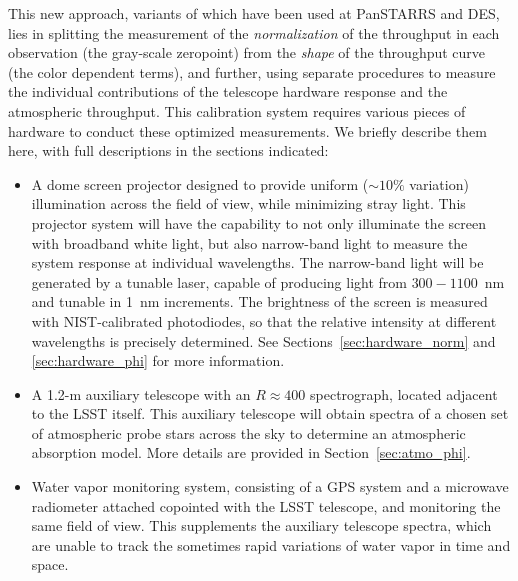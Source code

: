 \documentclass[12pt,preprint]{aastex}
\begin{document}
This new approach, variants of which have been used at PanSTARRS and DES, lies in splitting the measurement of the {\it
normalization} of the throughput in each observation (the gray-scale
zeropoint) from the {\it shape} of the throughput curve (the color
dependent terms), and further, using separate procedures to measure
the individual contributions of the telescope hardware response and
the atmospheric throughput. This calibration system requires various
pieces of hardware to conduct these optimized measurements. We briefly
describe them here, with full descriptions in the sections indicated:
\begin{itemize}
\item{A dome screen projector designed to provide uniform
    ($\sim10\%$ variation) illumination across the field of view, while
    minimizing stray light. This projector system will have the
    capability to not only illuminate the screen with broadband white
    light, but also narrow-band light to measure the system response
    at individual wavelengths. The narrow-band light will be generated
    by a tunable laser, capable of producing light from $300-1100$~nm
    and tunable in 1~nm increments. The brightness of the screen is measured 
    with NIST-calibrated photodiodes, so that the relative intensity at different 
    wavelengths is precisely determined.  See
    Sections~\ref{sec:hardware_norm} and \ref{sec:hardware_phi} for
    more information.}
\item{A 1.2-m auxiliary telescope with an $R \approx 400$ spectrograph,
    located adjacent to the LSST itself. This auxiliary telescope will
    obtain spectra of a chosen set of atmospheric probe stars across the sky to
    determine an atmospheric absorption model. More details are provided
  in Section~\ref{sec:atmo_phi}.}
\item{Water vapor monitoring system, consisting of a GPS system and a 
    microwave radiometer attached copointed with the LSST telescope, and monitoring 
    the same field of view.  This supplements the auxiliary telescope spectra, which are
    unable to track the sometimes rapid variations of water vapor in time and space.}  
\end{itemize}
\end{document}
